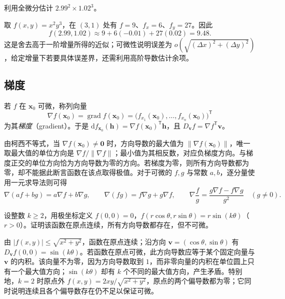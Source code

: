\documentclass[UTF8,12pt,a4paper,fontset=fandol]{ctexbook}
\begin{document}
\begin{example}
\label{ex:total-differential-approximation-ch14}
利用全微分估计 $2.99^2\times1.02^3$。
\end{example}
\begin{solve}
取 $f(x,y)=x^2y^3$，在 $(3,1)$ 处有 $f=9$、$f_x=6$、$f_y=27$。因此
\[
    f(2.99,1.02)\approx9+6(-0.01)+27(0.02)=9.48.
\]
这是舍去高于一阶增量所得的近似；可微性说明误差为 $o(\sqrt{(\Delta x)^2+(\Delta y)^2})$，给定增量下若要具体误差界，还需利用高阶导数估计余项。
\end{solve}

\subsection{梯度}
\label{subsec:gradient}

\begin{definition}
\label{def:gradient-ch14}
若 $f$ 在 $\boldsymbol x_0$ 可微，称列向量
\[
    \nabla f(\boldsymbol x_0)
    =\operatorname{grad}f(\boldsymbol x_0)
    =\bigl(f_{x_1}(\boldsymbol x_0),\ldots,f_{x_n}(\boldsymbol x_0)\bigr)^{\mathsf T}
\]
为其\emph{梯度}（gradient）。于是 $\mathrm df_{\boldsymbol x_0}(\boldsymbol h)=\nabla f(\boldsymbol x_0)^{\mathsf T}\boldsymbol h$，且 $D_{\boldsymbol v}f=\nabla f^{\mathsf T}\boldsymbol v$。
\end{definition}

由柯西不等式，当 $\nabla f(\boldsymbol x_0)\ne\boldsymbol0$ 时，方向导数的最大值为 $\|\nabla f(\boldsymbol x_0)\|$，唯一取最大值的单位方向是 $\nabla f/\|\nabla f\|$；最小值为其相反数，对应负梯度方向。与梯度正交的单位方向恰为方向导数为零的方向。若梯度为零，则所有方向导数都为零，却不能据此断言函数在该点取得极值。对于可微的 $f,g$ 与常数 $a,b$，逐分量使用一元求导法则可得
\[
    \nabla(af+bg)=a\nabla f+b\nabla g,\qquad
    \nabla(fg)=f\nabla g+g\nabla f,\qquad
    \nabla\frac fg=\frac{g\nabla f-f\nabla g}{g^2}\quad(g\ne0).
\]

\begin{example}
\label{ex:continuous-all-directional-not-differentiable-ch14}
设整数 $k\geq2$，用极坐标定义 $f(0,0)=0$，$f(r\cos\theta,r\sin\theta)=r\sin(k\theta)$（$r>0$）。证明该函数在原点连续，所有方向导数都存在，但不可微。
\end{example}
\begin{solve}
由 $|f(x,y)|\leq\sqrt{x^2+y^2}$，函数在原点连续；沿方向 $\boldsymbol v=(\cos\theta,\sin\theta)$ 有 $D_{\boldsymbol v}f(0,0)=\sin(k\theta)$。若函数在原点可微，此方向导数应等于某个固定向量与 $\boldsymbol v$ 的内积。该向量不为零，因为方向导数取到 $1$，而非零向量的内积在单位圆上只有一个最大值方向；$\sin(k\theta)$ 却有 $k$ 个不同的最大值方向，产生矛盾。特别地，$k=2$ 时原点外 $f(x,y)=2xy/\sqrt{x^2+y^2}$，原点的两个偏导数都为零；它同时说明连续且各个偏导数存在仍不足以保证可微。
\end{solve}
\end{document}

